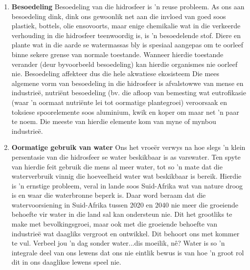       \label{m38138*id342223}\begin{enumerate}[noitemsep, label=\textbf{\arabic*}. ] 
            \label{m38138*uid91}\item \textbf{Besoedeling}\newline
Besoedeling van die hidrosfeer is  'n reuse probleem. As ons aan besoedeling dink, dink ons gewoonlik net aan die invloed van goed soos plastiek, bottels, olie ensovoorts, maar enige chemikalie wat in die verkeerde verhouding in die hidrosfeer teenwoordig is, is  'n besoedelende stof. Diere en plante wat in die aarde se watermassas bly is spesiaal aangepas om te oorleef binne sekere grense van normale toestande. Wanneer hierdie toestande verander (deur byvoorbeeld besoedeling) kan hierdie organismes nie oorleef nie. Besoedeling affekteer dus die hele akwatiese ekosisteem Die mees algemene vorm van besoedeling in die hidrosfeer is afvalstowwe van mense en industrie\"{e}, nutriënt besoedeling (bv. die afloop van bemesting wat eutrofikasie (waar  'n oormaat nutriënte lei tot oormatige plantegroei) veroorsaak en toksiese spoorelemente soos aluminium, kwik en koper om maar net  'n paar te noem. Die meeste van hierdie elemente kom van myne of mynbou industrieë.
\label{m38138*uid87}\item \textbf{Oormatige gebruik van water}\newline
Ons het vroe\"{e}r verwys na hoe slegs  'n klein persentasie van die hidrosfeer se water beskikbaar is as varswater. Ten spyte van hierdie feit gebruik die mens al meer water, tot so  'n mate dat die waterverbruik vinnig die hoeveelheid water wat beskikbaar is bereik. Hierdie is  'n ernstige probleem, veral in lande soos Suid-Afrika wat van nature droog is en waar die waterbronne beperk is. Daar word beraam dat die watervoorsiening in Suid-Afrika tussen 2020 en 2040 nie meer die groeiende behoefte vir water in die land sal kan ondersteun nie. Dit het grootliks te make met bevolkingsgroei, maar ook met die groeiende behoefte van industrieë wat daagliks vergroot en ontwikkel. Dit behoort ons met kommer te vul. Verbeel jou  'n dag sonder water...dis moeilik, nê? Water is so  'n integrale deel van ons lewens dat ons nie eintlik bewus is van hoe  'n groot rol dit in ons daaglikse lewens speel nie.
\end{enumerate}
\label{m38138*secfhsst!!!underscore!!!id1046}
